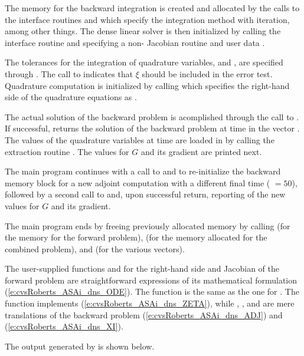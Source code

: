 The {\cvodes} memory for the backward integration is created and allocated
by the calls to the interface routines  and  which 
specify the  integration method with  iteration, among
other things.  The dense linear solver {\cvdense} is then initialized by calling
the  interface routine and specifying a non- Jacobian routine
 and user data .

The tolerances for the integration of quadrature variables,  and
, are specified through .
The call to  indicates that $\xi$ should be included
in the error test.
Quadrature computation is initialized by calling 
which specifies the right-hand side of the quadrature equations as .

The actual solution of the backward problem is acomplished through the call to
. If successful,  returns the solution of the backward 
problem at time  in the vector . The values of the quadrature
variables at time  are loaded in  by calling the extraction
routine . The values for $G$ and its gradient are printed next.

The main program continues with a call to  and
 to re-initialize the 
backward memory block for a new adjoint computation with a different final 
time ( $= 50$), followed by a second call to  and, upon successful
return, reporting of the new values for $G$ and its gradient.

The main program ends by freeing previously allocated memory by calling 
 (for the {\cvodes} memory for the forward problem),  
(for the memory allocated for the combined problem), and  
(for the various vectors).

The user-supplied functions  and  for the right-hand side and
Jacobian of the forward problem are straightforward expressions of its 
mathematical formulation (\ref{e:cvsRoberts_ASAi_dns_ODE}). 
The function  is the same as the one for .
The function  implements
(\ref{e:cvsRoberts_ASAi_dns_ZETA}), while , , and  are mere
translations of the backward problem (\ref{e:cvsRoberts_ASAi_dns_ADJ}) and
(\ref{e:cvsRoberts_ASAi_dns_XI}).

The output generated by  is shown below.

